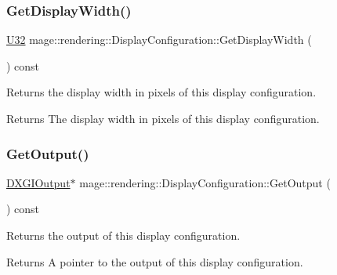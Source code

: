 \subsubsection{\texorpdfstring{Get\+Display\+Width()}{GetDisplayWidth()}}
{\footnotesize\ttfamily \mbox{\hyperlink{namespacemage_aa5d6eaabaac3cdd01873d6a3d27e90f3}{U32}} mage\+::rendering\+::\+Display\+Configuration\+::\+Get\+Display\+Width (\begin{DoxyParamCaption}{ }\end{DoxyParamCaption}) const\hspace{0.3cm}{\ttfamily [noexcept]}}

Returns the display width in pixels of this display configuration.

\begin{DoxyReturn}{Returns}
The display width in pixels of this display configuration. 
\end{DoxyReturn}
\mbox{\label{classmage_1_1rendering_1_1_display_configuration_a727b2e5ebcc286bb2ae39fd1f1e69445}} 
\subsubsection{\texorpdfstring{Get\+Output()}{GetOutput()}}
{\footnotesize\ttfamily \mbox{\hyperlink{namespacemage_1_1rendering_aaf22d3893277a4bd8497f6ea69b01532}{D\+X\+G\+I\+Output}}$\ast$ mage\+::rendering\+::\+Display\+Configuration\+::\+Get\+Output (\begin{DoxyParamCaption}{ }\end{DoxyParamCaption}) const\hspace{0.3cm}{\ttfamily [noexcept]}}

Returns the output of this display configuration.

\begin{DoxyReturn}{Returns}
A pointer to the output of this display configuration. 
\end{DoxyReturn}
\mbox{\label{classmage_1_1rendering_1_1_display_configuration_a7bbb45919b9cd4ae20cc9f4cac8a7069}} 
